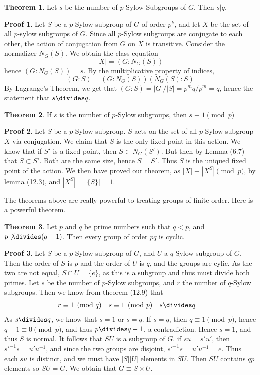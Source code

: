 \documentclass[12pt]{amsbook}
\theoremstyle{definition}
\newtheorem{theorem}{Theorem}[chapter]
\newtheorem*{prf}{Proof}
\begin{document}
\begin{theorem}
    Let $s$ be the number of $p$-Sylow Subgroups of $G$. Then $s | q$.
\end{theorem}
\begin{prf}
    Let $S$ be a $p$-Sylow subgroup of $G$ of order $p^k$, and let $X$ be the set of all $p$-sylow subgroups of $G$. Since all $p$-Sylow subgroups are conjugate to each other, the action of conjugation from $G$ on $X$ is transitive. Consider the normalizer $N_G(S)$. We obtain the class equation
    \[ |X| = (G:N_G(S)) \]
    hence $(G:N_G(S)) = s$. By the multiplicative property of indices,
    \[ (G:S) = (G:N_G(S))(N_G(S):S) \]
    By Lagrange's Theorem, we get that $(G:S) = |G|/|S| = p^mq/p^m = q$, hence the statement that $s \divides q$.
\end{prf}

\begin{theorem}
If $s$ is the number of $p$-Sylow subgroups, then $s \equiv 1 \pmod{p}$
\end{theorem}
\begin{prf}
    Let $S$ be a $p$-Sylow subgroup. $S$ acts on the set of all $p$-Sylow subgroup $X$ via conjugation. We claim that $S$ is the only fixed point in this action. We know that if $S'$ is a fixed point, then $S \subset N_G(S')$. But then by Lemma (6.7) that $S \subset S'$. Both are the same size, hence $S = S'$. Thus $S$ is the uniqued fixed point of the action. We then have proved our theorem, as $|X| \equiv |X^S| \pmod{p}$, by lemma (12.3), and $|X^S| = |\{S\}| = 1$.
\end{prf}

The theorems above are really powerful to treating groups of finite order. Here is a powerful theorem.

\begin{theorem}
    Let $p$ and $q$ be prime numbers such that $q < p$, and $p \not \divides (q-1)$. Then every group of order $pq$ is cyclic.
\end{theorem}
\begin{prf}
    Let $S$ be a $p$-Sylow subgroup of $G$, and $U$ a $q$-Sylow subgroup of $G$. Then the order of $S$ is $p$ and the order of $U$ is $q$, and the groups are cylic. As the two are not equal, $S \cap U = \{ e \}$, as this is a subgroup and thus must divide both primes. Let $s$ be the number of $p$-Sylow subgroups, and $r$ the number of $q$-Sylow subgroups. Then we know from theorem (12.9) that
    \begin{align*} r &\equiv 1 \pmod{q} & s &\equiv 1 \pmod{p} & s &\divides q \end{align*}
    As $s \divides q$, we know that $s = 1$ or $s = q$. If $s = q$, then $q \equiv 1 \pmod{p}$, hence $q-1 \equiv 0 \pmod{p}$, and thus $p \divides q-1$, a contradiction. Hence $s = 1$, and thus $S$ is normal. It follows that $SU$ is a subgroup of $G$. if $su = s'u'$, then $s'^{-1}s = u'u^{-1}$, and since the two groups are disjoint, $s'^{-1}s = u'u^{-1} = e$. Thus each $su$ is distinct, and we must have $|S||U|$ elements in $SU$. Then $SU$ contains $qp$ elements so $SU = G$. We obtain that $G \equiv S \times U$.
\end{prf}
\end{document}
